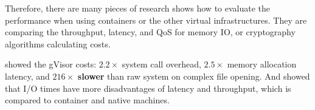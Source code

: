 Therefore, there are many pieces of research shows how to evaluate the performance when
using containers or the other virtual infrastructures\cite{7371699,KOZHIRBAYEV2017175,7095802,234857}.
They are comparing the throughput, latency, and QoS for memory IO, or cryptography
algorithms calculating costs.

\textcite{234857} showed the gVisor costs: $2.2\times$ system call overhead,
$2.5\times$ memory allocation latency, and $216\times$ \textbf{slower} than raw system on
complex file opening. And \textcite{KOZHIRBAYEV2017175} showed that I/O times have more
disadvantages of latency and throughput, which is compared to container and native machines.
